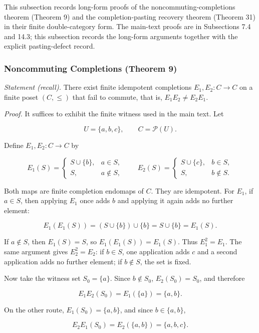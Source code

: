 \documentclass[11pt]{article}
\theoremstyle{definition}
\begin{document}
This subsection records long-form proofs of the noncommuting-completions theorem (Theorem 9) and the completion-pasting recovery theorem (Theorem 31) in their finite double-category form. The main-text proofs are in Subsections 7.4 and 14.3; this subsection records the long-form arguments together with the explicit pasting-defect record.

\subsubsection{Noncommuting Completions (Theorem 9)}

\emph{Statement (recall).} There exist finite idempotent completions \(E_{1},E_{2}:C\to C\) on a finite poset \((C,\le)\) that fail to commute, that is, \(E_{1}E_{2}\neq E_{2}E_{1}\).

\emph{Proof.} It suffices to exhibit the finite witness used in the main text. Let

\[
U=\{a,b,c\},\qquad C=\mathcal P(U).
\]

Define \(E_{1},E_{2}:C\to C\) by

\[
E_1(S)=
\begin{cases}
S\cup\{b\}, & a\in S,\\
S, & a\notin S,
\end{cases}
\qquad
E_2(S)=
\begin{cases}
S\cup\{c\}, & b\in S,\\
S, & b\notin S.
\end{cases}
\]

Both maps are finite completion endomaps of \(C\). They are idempotent. For \(E_1\), if \(a\in S\), then applying \(E_1\) once adds \(b\) and applying it again adds no further element:

\[
E_1(E_1(S))=(S\cup\{b\})\cup\{b\}=S\cup\{b\}=E_1(S).
\]

If \(a\notin S\), then \(E_1(S)=S\), so \(E_1(E_1(S))=E_1(S)\). Thus \(E_1^2=E_1\). The same argument gives \(E_2^2=E_2\): if \(b\in S\), one application adds \(c\) and a second application adds no further element; if \(b\notin S\), the set is fixed.

Now take the witness set \(S_0=\{a\}\). Since \(b\notin S_0\), \(E_2(S_0)=S_0\), and therefore

\[
E_1E_2(S_0)=E_1(\{a\})=\{a,b\}.
\]

On the other route, \(E_1(S_0)=\{a,b\}\), and since \(b\in\{a,b\}\),

\[
E_2E_1(S_0)=E_2(\{a,b\})=\{a,b,c\}.
\]
\end{document}
